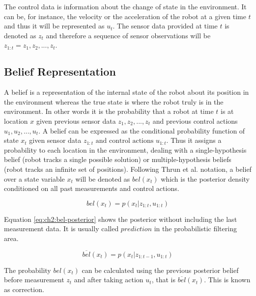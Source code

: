 The control data is information about the change of state in the environment\cite{Thrun:2005:PR:1121596}. It can be, for instance, the velocity or the acceleration of the robot at a given time $t$ and thus it will be represented as $u_t$.  The sensor data provided at time $t$ is denoted as $z_t$ and therefore a sequence of sensor observations will be $z_{1:t}= {z_1, z_2, ..., z_t}$.

\subsection{Belief Representation}\label{ch-2:sub:belief-representation}

A belief is a representation of the internal state of the robot about its position in the environment whereas the true state is where the robot truly is in the environment. In other words it is the probability that a robot at time $t$ is at location $x$ given previous sensor data $z_1, z_2, ..., z_t$ and previous control actions $u_1, u_2, ..., u_t$. A belief can be expressed as the conditional probability function of state $x_t$ given sensor data $z_{1:t} \text{ and control actions } u_{1:t}$. Thus it assigns a probability to each location in the environment, dealing with a single-hypothesis belief (robot tracks a single possible solution) or multiple-hypothesis beliefs (robot tracks an infinite set of positions)\cite{Siegwart:intro-autonumous-robots}. Following Thrun et al. notation, a belief over a state variable $x_t$ will be denoted as $bel(x_t)$ which is the posterior density conditioned on all past measurements and control actions.

\begin{equation}
bel(x_t) = p(x_t | z_{1:t}, u_{1:t})
\label{eq:ch2:bel-update}
\end{equation}

Equation \ref{eq:ch2:bel-posterior} shows the posterior without including the last measurement data. It is usually called $prediction$ in the probabilistic filtering area.

\begin{equation}
\overline{bel}(x_t) = p(x_t | z_{1:t-1}, u_{1:t})
\label{eq:ch2:bel-posterior}
\end{equation}

The probability $bel(x_t)$ can be calculated using the previous posterior belief before measurement $z_t$ and after taking action $u_t$, that is $\overline{bel}(x_t)$. This is known as correction\cite{Thrun:robotic-statistics}. 

